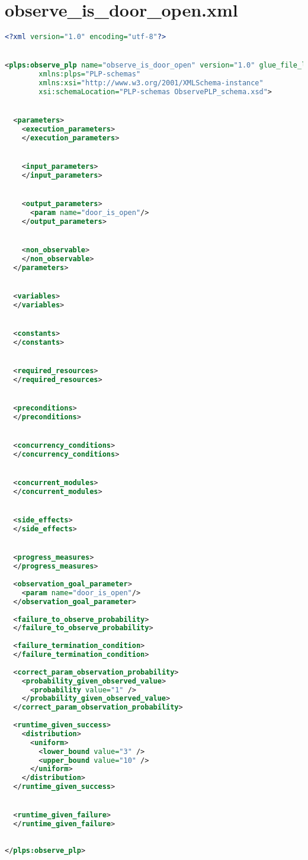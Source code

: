 \section{  observe_is_door_open.xml}\label{Appendix_3_9} 
\begin{lstlisting}[style=stylexml,language=XML]
<?xml version="1.0" encoding="utf-8"?>


<plps:observe_plp name="observe_is_door_open" version="1.0" glue_file_location=""
        xmlns:plps="PLP-schemas"
        xmlns:xsi="http://www.w3.org/2001/XMLSchema-instance"
        xsi:schemaLocation="PLP-schemas ObservePLP_schema.xsd">


  <parameters>
    <execution_parameters>
    </execution_parameters>


    <input_parameters>
    </input_parameters>


    <output_parameters>
      <param name="door_is_open"/>
    </output_parameters>


    <non_observable>
    </non_observable>
  </parameters>


  <variables>
  </variables>


  <constants>
  </constants>


  <required_resources>
  </required_resources>


  <preconditions>
  </preconditions>


  <concurrency_conditions>
  </concurrency_conditions>


  <concurrent_modules>
  </concurrent_modules>


  <side_effects>
  </side_effects>


  <progress_measures>
  </progress_measures>
  
  <observation_goal_parameter>
    <param name="door_is_open"/>
  </observation_goal_parameter>
  
  <failure_to_observe_probability>
  </failure_to_observe_probability>
  
  <failure_termination_condition>
  </failure_termination_condition>
  
  <correct_param_observation_probability>
    <probability_given_observed_value>
      <probability value="1" />
    </probability_given_observed_value>
  </correct_param_observation_probability>
  
  <runtime_given_success>
    <distribution>
      <uniform>
        <lower_bound value="3" />
        <upper_bound value="10" />
      </uniform>
    </distribution>
  </runtime_given_success>


  <runtime_given_failure>
  </runtime_given_failure>
 
 
</plps:observe_plp>
	\end{lstlisting}